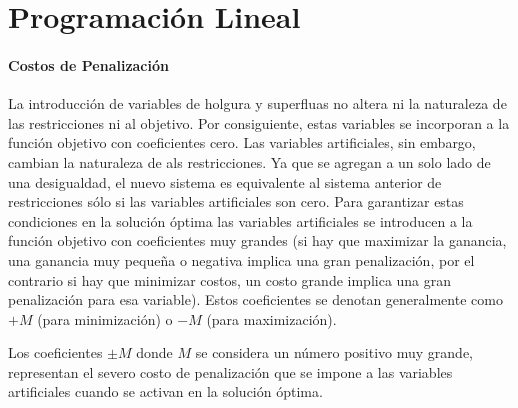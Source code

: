 \section{Programación Lineal}















\paragraph{Costos de Penalización}

La introducción de variables de holgura y superfluas no altera ni la naturaleza de las restricciones ni al objetivo. Por consiguiente, estas variables se incorporan a la función objetivo con coeficientes cero. Las variables artificiales, sin embargo, cambian la naturaleza de als restricciones. Ya que se agregan a un solo lado de una desigualdad, el nuevo sistema es equivalente al sistema anterior de restricciones sólo si las variables artificiales son cero. Para garantizar estas condiciones en la solución óptima las variables artificiales se introducen a la función objetivo con coeficientes muy grandes (si hay que maximizar la ganancia, una ganancia muy pequeña o negativa implica una gran penalización, por el contrario si hay que minimizar costos, un costo grande implica una gran penalización para esa variable). Estos coeficientes se denotan generalmente como \(+M\) (para minimización) o \(-M\) (para maximización).

Los coeficientes \(\pm M\) donde \(M\) se considera un número positivo muy grande, representan el severo costo de penalización que se impone a las variables artificiales cuando se activan en la solución óptima. 